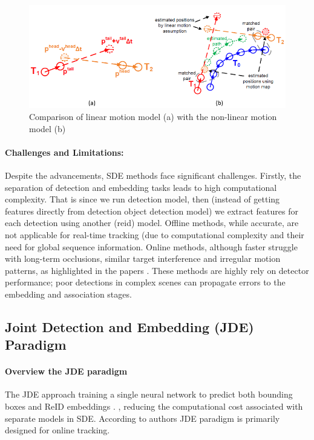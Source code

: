 \documentclass[12pt, a4paper]{article}
\begin{document}
\begin{figure}[h]
    \centering
    \includegraphics[width=0.95\linewidth]{pictures/motion_linear_nonlinear.png}
    \caption{Comparison of linear motion model (a) with the non-linear motion model (b)}
    \label{fig:motion_linera_non_linear}
\end{figure}

\paragraph{Challenges and Limitations:}
Despite the advancements, SDE methods face significant challenges. Firstly, the separation of detection and embedding tasks leads to high computational complexity. That is since we run detection model, then (instead of getting features directly from detection object detection model) we extract features for each detection using another (reid) model. Offline methods, while accurate, are not applicable for real-time tracking (due to computational complexity and their need for global sequence information. Online methods, although faster struggle with long-term occlusions, similar target interference and irregular motion patterns, as highlighted in the papers \cite{sota-trackets-survey, lit-review}. These methods are highly rely on detector performance; poor detections in complex scenes can propagate errors to the embedding and association stages.


\subsection{Joint Detection and Embedding (JDE) Paradigm}
\label{sec:Joint_detection_embedding}

\paragraph{Overview the JDE paradigm}
The JDE approach training a single neural network to predict both bounding boxes and ReID embeddings \cite{JDE-person-search}. , reducing the computational cost associated with separate models in SDE. According to authors \cite{sota-trackets-survey} JDE paradigm is primarily designed for online tracking.  
\end{document}
